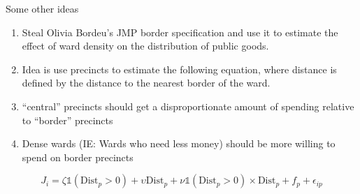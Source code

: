 \documentclass[11pt,notes=hide,aspectratio=169,mathserif]{beamer}
\begin{document}
\begin{frame}{Some other ideas}
	\begin{enumerate}
		\item Steal Olivia Bordeu's JMP border specification and use it to estimate the effect of ward density on the distribution of public goods.
		\item Idea is use precincts to estimate the following equation, where distance is defined by the distance to the nearest border of the ward.
		\item ``central'' precincts should get a disproportionate amount of spending relative to ``border'' precincts
		\item Dense wards (IE: Wards who need less money) should be more willing to spend on border precincts
	\end{enumerate}
		\begin{equation}
			J_i = \zeta \mathbb{1}(\text{Dist}_p >0) + \upsilon \text{Dist}_p + \nu \mathbb{1}(\text{Dist}_p > 0) \times \text{Dist}_p + f_p +\epsilon_{ip}
		\end{equation}
	\end{frame}


%

%
\end{document}
